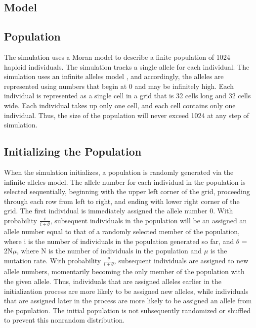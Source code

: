 \documentclass[12pt]{article}
\begin{document}
\begin{spacing}{1.6}
\section{Model}

\subsection{Population}
The simulation uses a Moran model \cite{moran} to describe a finite population of 1024 haploid individuals. The simulation tracks a single allele for each individual. The simulation uses an infinite alleles model \cite{moran}, and accordingly, the alleles are represented using numbers that begin at 0 and may be infinitely high. Each individual is represented as a single cell in a grid that is 32 cells long and 32 cells wide. Each individual takes up only one cell, and each cell contains only one individual. Thus, the size of the population will never exceed 1024 at any step of simulation.

\subsection{Initializing the Population}
When the simulation initializes, a population is randomly generated via the infinite alleles model. The allele number for each individual in the population is selected sequentially, beginning with the upper left corner of the grid, proceeding through each row from left to right, and ending with lower right corner of the grid. The first individual is immediately assigned the allele number 0. With probability $\displaystyle \frac {i}{i + \theta}$, subsequent individuals in the population will be an assigned an allele number equal to that of a randomly selected member of the population, where i is the number of individuals in the population generated so far, and $\theta$ = 2N$\mu$, where N is the number of individuals in the population and $\mu$ is the mutation rate. With probability $\displaystyle \frac{\theta}{i + \theta}$, subsequent individuals are assigned to new allele numbers, momentarily becoming the only member of the population with the given allele. Thus, individuals that are assigned alleles earlier in the initialization process are more likely to be assigned new alleles, while individuals that are assigned later in the process are more likely to be assigned an allele from the population. The initial population is not subsequently randomized or shuffled to prevent this nonrandom distribution.


\end{spacing}
\end{document}
